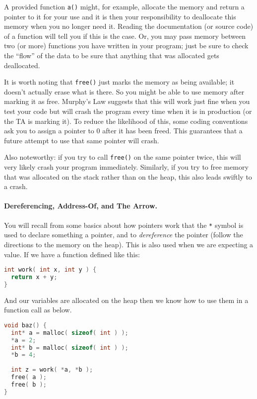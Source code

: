 A provided function \texttt{a()} might, for example, allocate the memory and return a pointer to it for your use and it is then your responsibility to deallocate this memory when you no longer need it. Reading the documentation (or source code) of a function will tell you if this is the case. Or, you may pass memory between two (or more) functions you have written in your program; just be sure to check the ``flow'' of the data to be sure that anything that was allocated gets deallocated.

It is worth noting that \texttt{free()} just marks the memory as being available; it doesn't actually erase what is there. So you might be able to use memory after marking it as free. Murphy's Law suggests that this will work just fine when you test your code but will crash the program every time when it is in production (or the TA is marking it). To reduce the likelihood of this, some coding conventions ask you to assign a pointer to 0 after it has been freed. This guarantees that a future attempt to use that same pointer will crash.

Also noteworthy: if you try to call \texttt{free()} on the same pointer twice, this will very likely crash your program immediately. Similarly, if you try to free memory that was allocated on the stack rather than on the heap, this also leads swiftly to a crash.

\paragraph{Dereferencing, Address-Of, and The Arrow.}
You will recall from some basics about how pointers work that the \texttt{*} symbol is used to declare something a pointer, and to \textit{dereference} the pointer (follow the directions to the memory on the heap). This is also used when we are expecting a value. If we have a function defined like this:

\begin{lstlisting}[language=C]
int work( int x, int y ) {
  return x + y;
}
\end{lstlisting}

And our variables are allocated on the heap then we know how to use them in a function call as below.

\begin{lstlisting}[language=C]
void baz() {
  int* a = malloc( sizeof( int ) );
  *a = 2;
  int* b = malloc( sizeof( int ) );
  *b = 4;
  
  int z = work( *a, *b );
  free( a );
  free( b );
}
\end{lstlisting}


